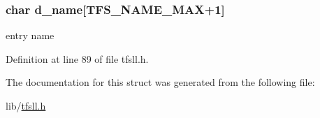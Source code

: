 \subsubsection[{d\+\_\+name}]{\setlength{\rightskip}{0pt plus 5cm}char d\+\_\+name\mbox{[}{\bf T\+F\+S\+\_\+\+N\+A\+M\+E\+\_\+\+M\+A\+X}+1\mbox{]}}\label{structdirent_a77ab5fc95e427fce262e6738c6ab02ca}
entry name 

Definition at line 89 of file tfsll.\+h.



The documentation for this struct was generated from the following file\+:\begin{DoxyCompactItemize}
\item 
lib/\hyperlink{tfsll_8h}{tfsll.\+h}\end{DoxyCompactItemize}
